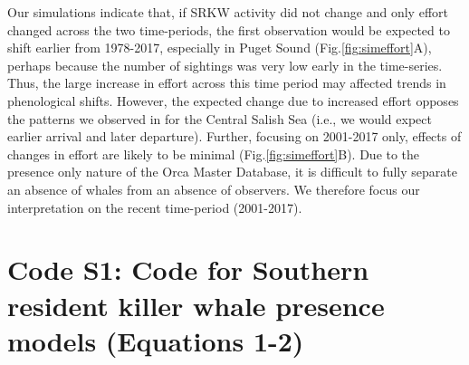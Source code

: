 \documentclass{article}
\begin{document}
\par Our simulations indicate that, if SRKW activity did not change and only effort changed across the two time-periods, the first observation would be expected to shift earlier from 1978-2017, especially in Puget Sound (Fig.\ref{fig:simeffort}A), perhaps because the number of sightings was very low early in the time-series. Thus, the large increase in effort across this time period may affected trends in phenological shifts.  However, the expected change due to increased effort opposes the patterns we observed in for the Central Salish Sea (i.e., we would expect earlier arrival and later departure). Further, focusing on 2001-2017 only, effects of changes in effort are likely to be minimal (Fig.\ref{fig:simeffort}B). Due to the presence only nature of the Orca Master Database, it is difficult to fully separate an absence of whales from an absence of observers. We therefore focus our interpretation on the recent time-period (2001-2017).




\pagebreak





\section*{Code S1: Code for Southern resident killer whale presence models 
(Equations 1-2)}
\end{document}
